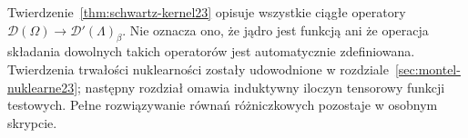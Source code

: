 \begin{uwaga}
\label{rem:kernel-scope23}
Twierdzenie~\ref{thm:schwartz-kernel23} opisuje wszystkie
ciągłe operatory $\mathcal D(\Omega)\to\mathcal D'(\Lambda)_\beta$.
Nie oznacza ono, że jądro jest funkcją ani że operacja
składania dowolnych takich operatorów jest automatycznie
zdefiniowana. Twierdzenia trwałości nuklearności zostały udowodnione
w rozdziale~\ref{sec:montel-nuklearne23}; następny rozdział omawia
induktywny iloczyn tensorowy funkcji testowych. Pełne rozwiązywanie równań
różniczkowych pozostaje w osobnym skrypcie.
\end{uwaga}
